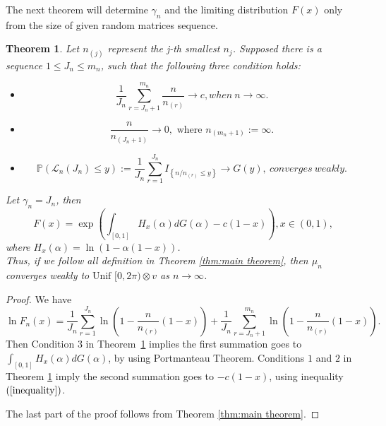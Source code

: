 \documentclass[12pt]{article}
\theoremstyle{plain}
\newtheorem{thm}{\textbf{Theorem}}
\theoremstyle{definition}
\theoremstyle{remark}
\begin{document}
The next theorem will determine $\gamma_n$ and the limiting distribution $F(x)$ only from the size of given random matrices sequence.
\begin{thm}\label{thm:main theorem 2 with L}
     Let $n_{(j)}$ represent the j-th smallest $n_j$. Supposed there is a sequence $1\leq J_n \leq m_n$, such that the following three condition holds:\\
    \begin{itemize}
        \item [1.]  \begin{equation*}
        \frac{1}{J_n}\sum_{r=J_n+1}^{m_n}\dfrac{n}{n_{(r)}}\rightarrow c, when\ n\rightarrow \infty.
        \end{equation*}
        \item [2.]\begin{equation*}
        \dfrac{n}{n_{(J_n+1)}}\rightarrow 0,\text{ where } n_{(m_n+1)}:=\infty.
        \end{equation*}

        \item [3.]  \begin{equation*}
        \mathbb{P}\left(\mathscr{L}_{n}(J_n) \leqslant y\right):=\frac{1}{J_{n}} \sum_{r=1}^{J_{n}} I_{\left\{n / n_{(r)} \leqslant y\right\}} \rightarrow G(y),\  converges\ weakly.
        \end{equation*}
    \end{itemize}

    Let $\gamma_{n}=J_n$, then
    \begin{equation}
    F(x)=\exp(\int_{[0,1]} H_{x}(\alpha) d G(\alpha)-c(1-x)), x \in(0,1),
    \end{equation}
    where $H_{x}(\alpha)=\ln (1-\alpha(1-x))$.\\
    Thus, if we follow all definition in Theorem \ref{thm:main theorem}, then  $\mu_{n}$ converges weakly to$\text { Unif }[0,2 \pi) \otimes v$ as $n\to \infty$.
    \end{thm}


\begin{proof} We have
    \begin{equation*}
    \ln F_n(x)=\frac{1}{J_{n}} \sum_{r=1}^{J_{n}} \ln \left(1-\frac{n}{n_{(r)}}(1-x)\right)
    +\frac{1}{J_{n}} \sum_{r=J_n+1}^{m_n} \ln
    \left(1-\frac{n}{n_{(r)}}(1-x)\right).
    \end{equation*}
Then Condition $3$ in Theorem~\ref{thm:main theorem 2 with L}
implies the first summation goes to
    $\int_{[0,1]} H_{x}(\alpha) d G(\alpha)$, by using Portmanteau Theorem. Conditions $1$ and $2$ in Theorem \ref{thm:main theorem 2 with L}
    imply the second summation goes to $-c(1-x)$, using inequality $(\ref{inequality})$.

    The last part of the proof follows from Theorem \ref{thm:main theorem}.
\end{proof}
\end{document}
